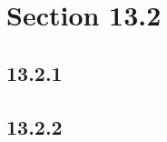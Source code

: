 





\section*{Section 13.2}

\subsection*{13.2.1}
\begin{enumerate}
\end{enumerate}

\subsection*{13.2.2}
\begin{enumerate}
\end{enumerate}

